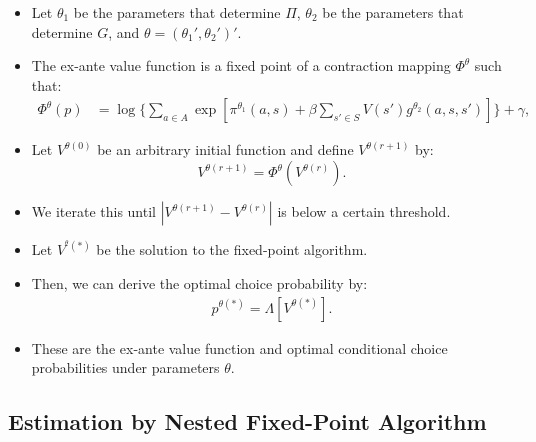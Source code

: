 \documentclass[
]{book}
\providecommand{\tightlist}{%
  \setlength{\itemsep}{0pt}\setlength{\parskip}{0pt}}
\begin{document}
\begin{itemize}
\tightlist
\item
  Let \(\theta_1\) be the parameters that determine \(\Pi\), \(\theta_2\) be the parameters that determine \(G\), and \(\theta = (\theta_1', \theta_2')'\).
\item
  The ex-ante value function is a fixed point of a contraction mapping \(\Phi^\theta\) such that:
  \begin{equation}
  \begin{split}
  \Phi^\theta(p) &=\log \Bigg\{\sum_{a \in A} \exp[\pi^{\theta_1}(a , s) + \beta \sum_{s' \in S} V(s') g^{\theta_2}(a, s, s')] \Bigg\} + \gamma,
  \end{split}
  \end{equation}
\item
  Let \(V^{\theta (0)}\) be an arbitrary initial function and define \(V^{\theta (r + 1)}\) by:
  \[
  V^{\theta (r + 1)} = \Phi^{\theta}(V^{\theta (r)}).
  \]
\item
  We iterate this until \(|V^{\theta (r + 1)} - V^{\theta (r)}|\) is below a certain threshold.
\item
  Let \(V^{^\theta (\ast)}\) be the solution to the fixed-point algorithm.
\item
  Then, we can derive the optimal choice probability by:
  \begin{equation}
  \begin{split}
  p^{\theta (\ast)} = \Lambda\left[V^{\theta (\ast)}\right].
  \end{split}
  \end{equation}
\item
  These are the ex-ante value function and optimal conditional choice probabilities under parameters \(\theta\).
\end{itemize}

\hypertarget{estimation-by-nested-fixed-point-algorithm-1}{%
\subsection{Estimation by Nested Fixed-Point Algorithm}\label{estimation-by-nested-fixed-point-algorithm-1}}
\end{document}

